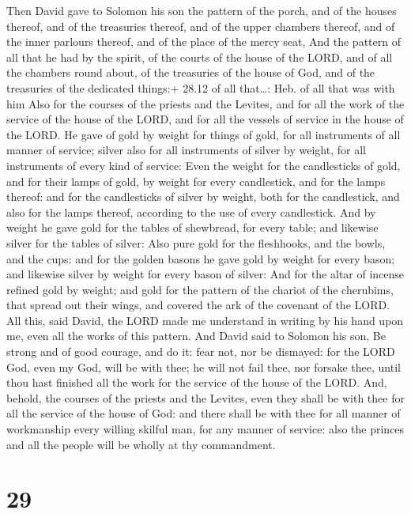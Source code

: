  Then David gave to Solomon his son the pattern of the
porch, and of the houses thereof, and of the treasuries thereof, and of
the upper chambers thereof, and of the inner parlours thereof, and of
the place of the mercy seat,  And the pattern of all that
he had by the spirit, of the courts of the house of the LORD, and of all
the chambers round about, of the treasuries of the house of God, and of
the treasuries of the dedicated things:+ 28.12 of all that\ldots: Heb.
of all that was with him  Also for the courses of the
priests and the Levites, and for all the work of the service of the
house of the LORD, and for all the vessels of service in the house of
the LORD.  He gave of gold by weight for things of gold,
for all instruments of all manner of service; silver also for all
instruments of silver by weight, for all instruments of every kind of
service:  Even the weight for the candlesticks of gold, and
for their lamps of gold, by weight for every candlestick, and for the
lamps thereof: and for the candlesticks of silver by weight, both for
the candlestick, and also for the lamps thereof, according to the use of
every candlestick.  And by weight he gave gold for the
tables of shewbread, for every table; and likewise silver for the tables
of silver:  Also pure gold for the fleshhooks, and the
bowls, and the cups: and for the golden basons he gave gold by weight
for every bason; and likewise silver by weight for every bason of
silver:  And for the altar of incense refined gold by
weight; and gold for the pattern of the chariot of the cherubims, that
spread out their wings, and covered the ark of the covenant of the LORD.
 All this, said David, the LORD made me understand in
writing by his hand upon me, even all the works of this pattern.
 And David said to Solomon his son, Be strong and of good
courage, and do it: fear not, nor be dismayed: for the LORD God, even my
God, will be with thee; he will not fail thee, nor forsake thee, until
thou hast finished all the work for the service of the house of the
LORD.  And, behold, the courses of the priests and the
Levites, even they shall be with thee for all the service of the house
of God: and there shall be with thee for all manner of workmanship every
willing skilful man, for any manner of service: also the princes and all
the people will be wholly at thy commandment.

\hypertarget{section-28}{%
\section{29}\label{section-28}}

